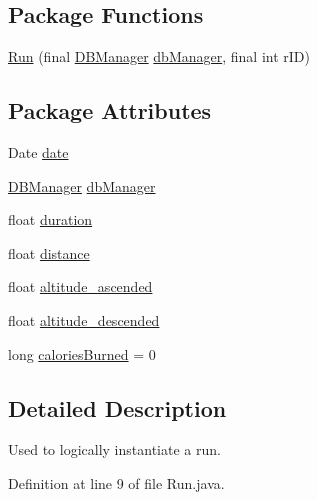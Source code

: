 \subsection*{Package Functions}
\begin{DoxyCompactItemize}
\item 
\mbox{\hyperlink{classcom_1_1activitytracker_1_1_run_a5568c1c514835056d2abc22cfba222c5}{Run}} (final \mbox{\hyperlink{classcom_1_1activitytracker_1_1_d_b_manager}{D\+B\+Manager}} \mbox{\hyperlink{classcom_1_1activitytracker_1_1_run_ab90e32eda9f4c671ae3575f971edca6b}{db\+Manager}}, final int r\+ID)
\end{DoxyCompactItemize}
\subsection*{Package Attributes}
\begin{DoxyCompactItemize}
\item 
Date \mbox{\hyperlink{classcom_1_1activitytracker_1_1_run_a66934b1f4fe6bc74a4e98574a2892764}{date}}
\item 
\mbox{\hyperlink{classcom_1_1activitytracker_1_1_d_b_manager}{D\+B\+Manager}} \mbox{\hyperlink{classcom_1_1activitytracker_1_1_run_ab90e32eda9f4c671ae3575f971edca6b}{db\+Manager}}
\item 
float \mbox{\hyperlink{classcom_1_1activitytracker_1_1_run_a5e38d293d29d4b65c9290ff4bee82e03}{duration}}
\item 
float \mbox{\hyperlink{classcom_1_1activitytracker_1_1_run_a7b4ca8c4ecea4da1653f03b8c8fc16a8}{distance}}
\item 
float \mbox{\hyperlink{classcom_1_1activitytracker_1_1_run_a247fe29ef5dceeb25750fc7c2701f5c8}{altitude\+\_\+ascended}}
\item 
float \mbox{\hyperlink{classcom_1_1activitytracker_1_1_run_a26cd078680ee374482ce848b90308dda}{altitude\+\_\+descended}}
\item 
long \mbox{\hyperlink{classcom_1_1activitytracker_1_1_run_aa4c73467653a47d3b14ff6653bbab853}{calories\+Burned}} = 0
\end{DoxyCompactItemize}


\subsection{Detailed Description}
Used to logically instantiate a run. 

Definition at line 9 of file Run.\+java.




